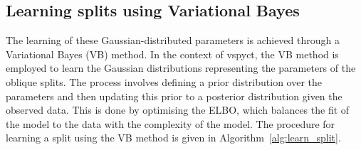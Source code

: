 \documentclass[3p,review,authoryear]{elsarticle}
\begin{document}
\subsection{Learning splits using Variational Bayes}


The learning of these Gaussian-distributed parameters is achieved through a Variational Bayes (VB) method.
In the context of \gls{vspyct}, the VB method is employed to learn the Gaussian distributions representing the parameters of the oblique splits.
The process involves defining a prior distribution over the parameters and then updating this prior to a posterior distribution given the observed data.
This is done by optimising the ELBO, which balances the fit of the model to the data with the complexity of the model.
The procedure for learning a split using the VB method is given in Algorithm~\ref{alg:learn_split}.
\end{document}
